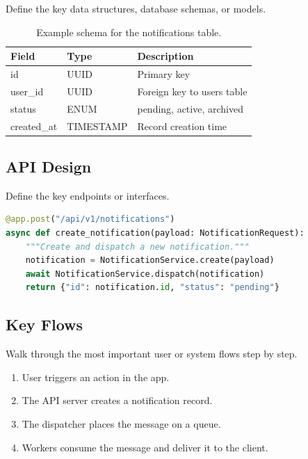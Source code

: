 \documentclass[11pt, a4paper]{article}
\begin{document}
Define the key data structures, database schemas, or models.

\begin{table}[h]
    \centering
    \begin{tabular}{@{} l l l @{}}
        \toprule
        \textbf{Field} & \textbf{Type} & \textbf{Description} \\
        \midrule
        id             & UUID          & Primary key \\
        user\_id       & UUID          & Foreign key to users table \\
        status         & ENUM          & pending, active, archived \\
        created\_at    & TIMESTAMP     & Record creation time \\
        \bottomrule
    \end{tabular}
    \caption{Example schema for the notifications table.}
\end{table}

\subsection{API Design}

Define the key endpoints or interfaces.

\begin{lstlisting}[language=Python, caption={Example endpoint}]
@app.post("/api/v1/notifications")
async def create_notification(payload: NotificationRequest):
    """Create and dispatch a new notification."""
    notification = NotificationService.create(payload)
    await NotificationService.dispatch(notification)
    return {"id": notification.id, "status": "pending"}
\end{lstlisting}

\subsection{Key Flows}

Walk through the most important user or system flows step by step.

\begin{enumerate}
    \item User triggers an action in the app.
    \item The API server creates a notification record.
    \item The dispatcher places the message on a queue.
    \item Workers consume the message and deliver it to the client.
\end{enumerate}
\end{document}
